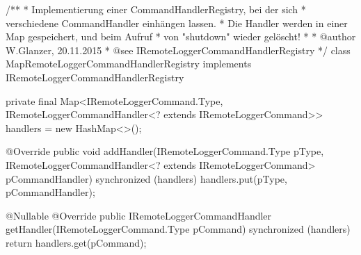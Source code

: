 \begin{spacing}{0.75}
	\begin{javacode}
/**
 * Implementierung einer CommandHandlerRegistry, bei der sich
 * verschiedene CommandHandler einhängen lassen.
 * Die Handler werden in einer Map gespeichert, und beim Aufruf
 * von "shutdown" wieder gelöscht!
 *
 * @author W.Glanzer, 20.11.2015
 * @see IRemoteLoggerCommandHandlerRegistry
 */
class MapRemoteLoggerCommandHandlerRegistry implements IRemoteLoggerCommandHandlerRegistry
{

  private final Map<IRemoteLoggerCommand.Type, 
   IRemoteLoggerCommandHandler<? extends IRemoteLoggerCommand>> handlers = new HashMap<>();

  @Override
  public void addHandler(IRemoteLoggerCommand.Type pType, 
   IRemoteLoggerCommandHandler<? extends IRemoteLoggerCommand> pCommandHandler)
  {
    synchronized (handlers)
    {
      handlers.put(pType, pCommandHandler);
    }
  }

  @Nullable
  @Override
  public IRemoteLoggerCommandHandler getHandler(IRemoteLoggerCommand.Type pCommand)
  {
    synchronized (handlers)
    {
      return handlers.get(pCommand);
    }
  }
}    \end{javacode}
\end{spacing}